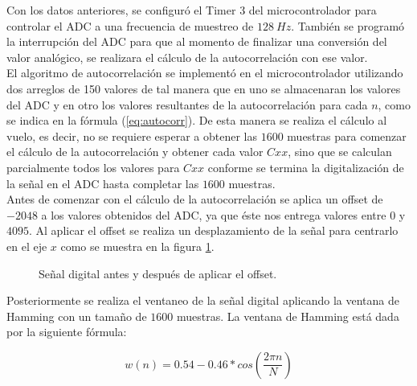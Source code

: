 Con los datos anteriores, se configuró el Timer 3 del microcontrolador para controlar el ADC a una frecuencia de muestreo de $128\ Hz$. También se programó la interrupción del ADC para que al momento de finalizar una conversión del valor analógico, se realizara el cálculo de la autocorrelación con ese valor. \\

El algoritmo de autocorrelación se implementó en el microcontrolador utilizando dos arreglos de 150 valores de tal manera que en uno se almacenaran los valores del ADC y en otro los valores resultantes de la autocorrelación para cada $n$, como se indica en la fórmula (\ref{eq:autocorr}). De esta manera se realiza el cálculo al vuelo, es decir, no se requiere esperar a obtener las $1600$ muestras para comenzar el cálculo de la autocorrelación y obtener cada valor $Cxx$, sino que se calculan parcialmente todos los valores para $Cxx$ conforme se termina la digitalización de la señal en el ADC hasta completar las $1600$ muestras. \\

Antes de comenzar con el cálculo de la autocorrelación se aplica un offset de $-2048$ a los valores obtenidos del ADC, ya que éste nos entrega valores entre $0$ y $4095$. Al aplicar el offset se realiza un desplazamiento de la señal para centrarlo en el eje $x$ como se muestra en la figura \ref{fig:offset}. \\

\begin{figure}[htbp!]
	\centering
	\caption{Señal digital antes y después de aplicar el offset.}
	\label{fig:offset}
\end{figure}

Posteriormente se realiza el ventaneo de la señal digital aplicando la ventana de Hamming con un tamaño de $1600$ muestras. La ventana de Hamming está dada por la siguiente fórmula: 

\begin{equation}
\label{eq_hamming}
w(n) = 0.54 - 0.46 * cos(\frac{2\pi n}{N})
\end{equation}

